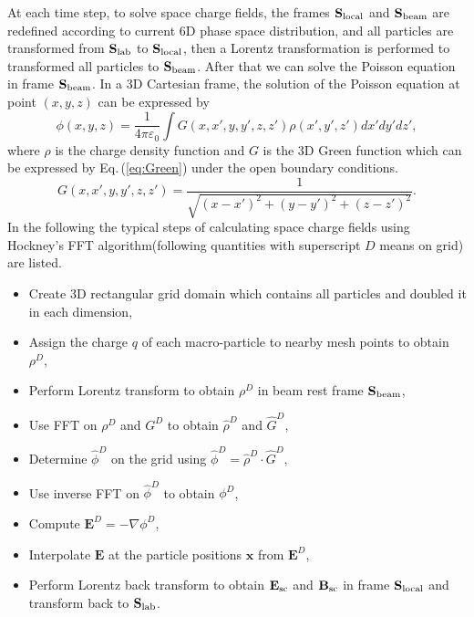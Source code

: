 \documentclass[aps,prstab,twocolumn,superscriptaddress]{revtex4}
\newcommand{\bs}[1]{\mathbf #1}
\begin{document}
At each time step, to solve space charge fields, the frames $\bs{S}_{\RM{local}}$ and $\bs{S}_{\RM{beam}}$ are redefined according to current 6D 
phase space distribution, and all particles are transformed from $\bs{S}_{\RM{lab}}$ to $\bs{S}_{\RM{local}}$, 
then a Lorentz transformation is performed to transformed all particles to $\bs{S}_{\RM{beam}}$.
After that we can solve the Poisson equation in frame $\bs{S}_{\RM{beam}}$. In a 3D Cartesian frame, the solution of the Poisson equation at point $(x,y,z)$ can be expressed by 
\begin{equation}\label{eq:Poten}
  \phi(x,y,z)= \frac{1}{4\pi\varepsilon_0}\int{G(x,x',y,y',z,z')\rho(x',y',z')dx'dy'dz'},
\end{equation}
where $\rho $ is the charge density function and $G$ is the 3D Green function which can be expressed by Eq.\,(\ref{eq:Green}) under the open boundary conditions.
\begin{equation}\label{eq:Green}
  G(x,x',y,y',z,z')= \frac{1}{\sqrt{(x-x')^2+(y-y')^2+(z-z')^2}}.
\end{equation}
In the following the typical steps of calculating space charge fields using Hockney's FFT algorithm\cite{Hockney:1}(following quantities with superscript $D$ means on grid) are listed.
\begin{itemize}
\item Create 3D rectangular grid domain which contains all particles and doubled it in each dimension, 
\item Assign the charge $q$ of each macro-particle to nearby mesh points to obtain $\rho^D$, 
\item Perform Lorentz transform to obtain $\rho^D$ in beam rest frame $\bs{S}_{\RM{beam}}$,
\item Use FFT on $\rho^D$ and $G^D$ to obtain $\widehat{\rho}^D$ and $\widehat{G}^D$,
\item Determine $\widehat{\phi}^D$ on the grid using $\widehat{\phi}^D = \widehat{\rho}^D \cdot \widehat{G}^D$,
\item Use inverse FFT on $\widehat{\phi }^D$ to obtain $\phi^D$,
\item Compute $\bs{E}^D= -\nabla \phi^D$,
\item Interpolate $\bs{E}$ at the particle positions $\bs{x}$ from $\bs{E}^D$,
\item Perform Lorentz back transform to obtain $\bs{E_{\RM{sc}}}$ and $\bs{B_{\RM{sc}}}$ in  frame $\bs{S}_{\RM{local}}$ and transform back  to $\bs{S}_{\RM{lab}}$.
\end{itemize}
\end{document}
